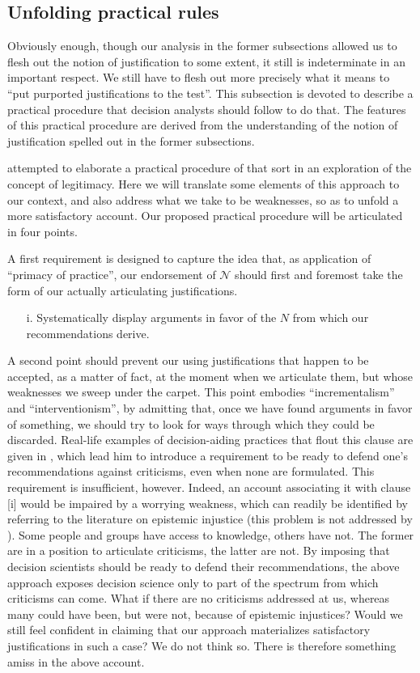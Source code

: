 \documentclass[preprint, french, english, 11pt, authoryear]{elsarticle}%
\newcommand{\adv}{\mathscr{N}}
\begin{document}
\subsection{Unfolding practical rules}
Obviously enough, though our analysis in the former subsections allowed us to flesh out the notion of justification to some extent, it still is indeterminate in an important respect. We still have to flesh out more precisely what it means to ``put purported justifications to the test''. This subsection is devoted to describe a practical procedure that decision analysts should follow to do that. The features of this practical procedure are derived from the understanding of the notion of justification spelled out in the former subsections.

\citet{meinard_what_2017} attempted to elaborate a practical procedure of that sort in an exploration of the concept of legitimacy. Here we will translate some elements of this approach to our context, and also address what we take to be weaknesses, so as to unfold a more satisfactory account. Our proposed practical procedure will be articulated in four points.

A first requirement is designed to capture the idea that, as application of “primacy of practice”, our endorsement of $\adv$ should first and foremost take the form of our actually articulating justifications.

\begin{itemize}
\item[i.]	Systematically display arguments in favor of the $N$ from which our recommendations derive.
\end{itemize}
A second point should prevent our using justifications that happen to be accepted, as a matter of fact, at the moment when we articulate them, but whose weaknesses we sweep under the carpet. This point embodies “incrementalism” and ``interventionism'', by admitting that, once we have found arguments in favor of something, we should try to look for ways through which they could be discarded. Real-life examples of decision-aiding practices that flout this clause are given in \cite{meinard_what_2017}, which lead him to introduce a requirement to be ready to defend one's recommendations against criticisms, even when none are formulated. This requirement is insufficient, however. Indeed, an account associating it with clause [i] would be impaired by a worrying weakness, which can readily be identified by referring to the literature on epistemic injustice \citep{fricker_epistemic_2007} (this problem is not addressed by \cite{meinard_what_2017}). Some people and groups have access to knowledge, others have not. The former are in a position to articulate criticisms, the latter are not. By imposing that decision scientists should be ready to defend their recommendations, the above approach exposes decision science only to part of the spectrum from which criticisms can come. What if there are no criticisms addressed at us, whereas many could have been, but were not, because of epistemic injustices? Would we still feel confident in claiming that our approach materializes satisfactory justifications in such a case? We do not think so. There is therefore something amiss in the above account.
\end{document}
